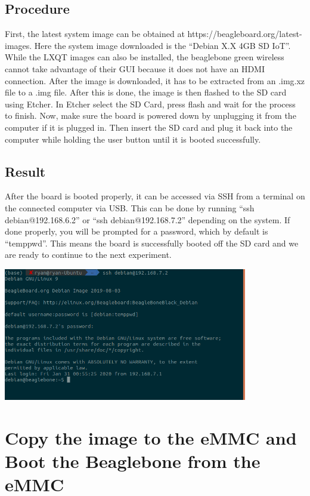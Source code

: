 \documentclass{article}
\begin{document}
\subsection{Procedure}
First, the latest system image can be obtained at https://beagleboard.org/latest-images. Here the system image downloaded is the “Debian X.X 4GB SD IoT”. While the LXQT images can also be installed, the beaglebone green wireless cannot take advantage of their GUI because it does not have an HDMI connection. After the image is downloaded, it has to be extracted from an .img.xz file to a .img file. After this is done, the image is then flashed to the SD card using Etcher. In Etcher select the SD Card, press flash and wait for the process to finish. Now, make sure the board is powered down by unplugging it from the computer if it is plugged in. Then insert the SD card and plug it back into the computer while holding the user button until it is booted successfully. 

\subsection{Result}
After the board is booted properly, it can be accessed via SSH from a terminal on the connected computer via USB. This can be done by running “ssh debian@192.168.6.2” or “ssh debian@192.168.7.2” depending on the system. If done properly, you will be prompted for a password, which by default is “temppwd”. This means the board is successfully booted off the SD card and we are ready to continue to the next experiment.
\begin{center}
	\includegraphics[width=0.8\textwidth]{img/Lab1_1.PNG}
\end{center}
\clearpage
\section{Copy the image to the eMMC and Boot the Beaglebone from the eMMC}
\end{document}
